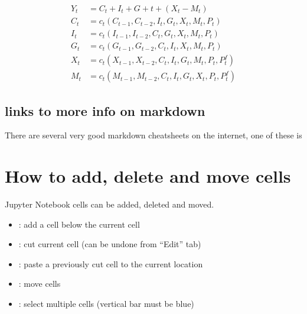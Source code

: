 \documentclass[letterpaper,10pt,english]{jupyterBook}
\begin{document}
\begin{align*}
Y_t  &=  C_t+I_t+G+t+ (X_t-M_t) \\
C_t &= c_t(C_{t-1},C_{t-2},I_t,G_t,X_t,M_t,P_t)\\
I_t &= c_t(I_{t-1},I_{t-2},C_t,G_t,X_t,M_t,P_t)\\
G_t &= c_t(G_{t-1},G_{t-2},C_t,I_t,X_t,M_t,P_t)\\
X_t &= c_t(X_{t-1},X_{t-2},C_t,I_t,G_t,M_t,P_t,P^f_t)\\
M_t &= c_t(M_{t-1},M_{t-2},C_t,I_t,G_t,X_t,P_t,P^f_t)
\end{align*}

\subsection{links to more info on markdown}
\label{\detokenize{content/04_PythonEssentials/Intro_Jupyter_notebook:links-to-more-info-on-markdown}}
\sphinxAtStartPar
There are several very good markdown cheatsheets on the internet, one of these is 


\section{How to add, delete and move cells}
\label{\detokenize{content/04_PythonEssentials/Intro_Jupyter_notebook:how-to-add-delete-and-move-cells}}
\sphinxAtStartPar
Jupyter Notebook cells can be added, deleted and moved.

\sphinxAtStartPar
{}
\begin{itemize}
\item {} 
\sphinxAtStartPar
{}: add a cell below the current cell

\item {} 
\sphinxAtStartPar
{}: cut  current cell (can be undone from “Edit” tab)

\item {} 
\sphinxAtStartPar
{}: paste a previously cut cell to the current location

\item {} 
\sphinxAtStartPar
{}: move cells

\item {} 
\sphinxAtStartPar
{}: select multiple cells (vertical bar must be blue)

\end{itemize}
\end{document}

